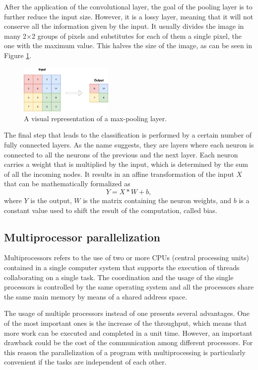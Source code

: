 \documentclass{usiinftr}
\begin{document}
After the application of the convolutional layer, the goal of the pooling layer  is to further reduce the input size. However, it  is a lossy layer, meaning that it will not conserve all the information given by the input.
It usually divides the image in many 2$\times$2 groups of pixels and substitutes for each of them a single pixel, the one with the maximum  value. This halves the size of the image, as can be seen in Figure \ref{fig:12}.
\begin{figure}[H]
	\centering
	\includegraphics[width=0.4\textwidth]{img/maxpool}
	\caption{A visual representation of a max-pooling layer.}
	\label{fig:12}
\end{figure}

The final step that leads to the classification is performed by a certain number of fully connected layers. As the name suggests, they are layers where each neuron is connected to all the neurons of the previous and the next layer. Each neuron carries a weight that is multiplied by the input, which is determined by the sum of all the incoming nodes. It results in an affine transformation of the input $X$ that can be mathematically formalized as
$$Y=X*W+b,$$
where $Y$ is the output, $W$ is the matrix containing the neuron weights, and $b$ is a constant value used to shift the result of the computation, called bias. 



\subsection{Multiprocessor parallelization}
Multiprocessors refers to the use of two or more CPUs (central processing units) contained in a single computer system that supports the execution of threads collaborating on a single task. The coordination and the usage of the single processors is controlled by the same operating system and all the processors share the same main memory by means of a shared address space.

The usage of multiple processors instead of one presents several advantages. One of the most important ones is the increase of the  throughput, which means that more work can be executed and completed in a unit time. However, an important drawback could be the cost of the communication among different processors. For this reason the parallelization of a program with multiprocessing is particularly convenient if the tasks are independent of each other.
\end{document}
